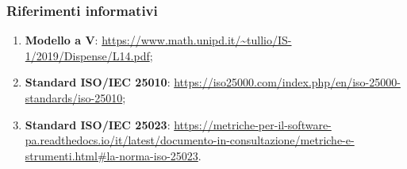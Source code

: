 		\subsubsection{Riferimenti informativi}
		\begin{enumerate}
		    \item \textbf{Modello a V}: \url{https://www.math.unipd.it/~tullio/IS-1/2019/Dispense/L14.pdf};
		    \item \textbf{Standard ISO/IEC 25010}: \url{https://iso25000.com/index.php/en/iso-25000-standards/iso-25010};
   		    \item \textbf{Standard ISO/IEC 25023}: \url{https://metriche-per-il-software-pa.readthedocs.io/it/latest/documento-in-consultazione/metriche-e-strumenti.html#la-norma-iso-25023}.
		\end{enumerate}
	
	
	

	
	
	
	
